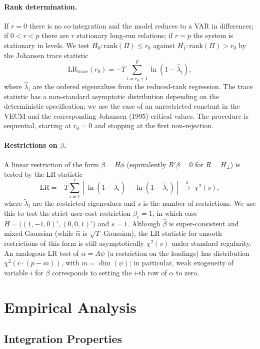 \documentclass[12pt]{article}
\begin{document}
\paragraph{Rank determination.} If $r=0$ there is no co-integration and the model reduces to a VAR in differences; if $0<r<p$ there are $r$ stationary long-run relations; if $r=p$ the system is stationary in levels. We test $H_0: \text{rank}(\Pi)\leq r_0$ against $H_1: \text{rank}(\Pi)>r_0$ by the Johansen trace statistic
\[
\mathrm{LR}_{\mathrm{trace}}(r_0) = -T\sum_{i=r_0+1}^{p}\ln(1-\hat{\lambda}_i),
\]
where $\hat\lambda_i$ are the ordered eigenvalues from the reduced-rank regression. The trace statistic has a non-standard asymptotic distribution depending on the deterministic specification; we use the case of an unrestricted constant in the VECM and the corresponding Johansen (1995) critical values. The procedure is sequential, starting at $r_0=0$ and stopping at the first non-rejection.

\paragraph{Restrictions on $\beta$.} A linear restriction of the form $\beta = H\phi$ (equivalently $R'\beta=0$ for $R=H_\perp$) is tested by the LR statistic
\[
\mathrm{LR} = -T\sum_{i=1}^{r}\!\left[\ln(1-\tilde\lambda_i)-\ln(1-\hat\lambda_i)\right]\;\stackrel{d}{\to}\;\chi^2(s),
\]
where $\tilde\lambda_i$ are the restricted eigenvalues and $s$ is the number of restrictions. We use this to test the strict user-cost restriction $\beta_r=1$, in which case $H=\bigl((1,-1,0)',(0,0,1)'\bigr)$ and $s=1$. Although $\hat\beta$ is super-consistent and mixed-Gaussian (while $\hat\alpha$ is $\sqrt{T}$-Gaussian), the LR statistic for smooth restrictions of this form is still asymptotically $\chi^2(s)$ under standard regularity. An analogous LR test of $\alpha = A\psi$ (a restriction on the loadings) has distribution $\chi^2(r\cdot(p-m))$, with $m=\dim(\psi)$; in particular, weak exogeneity of variable $i$ for $\beta$ corresponds to setting the $i$-th row of $\alpha$ to zero.

\section{Empirical Analysis}

\subsection{Integration Properties}
\end{document}
